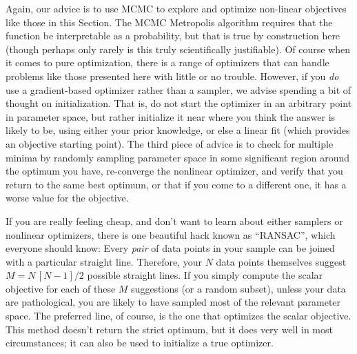 \documentclass[12pt,twoside]{article}
\newcommand{\sectionname}{Section}
\newcounter{problem}
\begin{document}
Again, our advice is to use MCMC to explore and optimize non-linear
objectives like those in this \sectionname.  The MCMC Metropolis
algorithm requires that the function be interpretable as a
probability, but that is true by construction here (though perhaps
only rarely is this truly scientifically justifiable).  Of course when
it comes to pure optimization, there is a range of optimizers that can
handle problems like those presented here with little or no trouble.
However, if you \emph{do} use a gradient-based optimizer rather than a
sampler, we advise spending a bit of thought on initialization.  That
is, do not start the optimizer in an arbitrary point in parameter
space, but rather initialize it near where you think the answer is
likely to be, using either your prior knowledge, or else a linear fit
(which provides an objective starting point).  The third piece of
advice is to check for multiple minima by randomly sampling parameter
space in some significant region around the optimum you have,
re-converge the nonlinear optimizer, and verify that you return to the
same best optimum, or that if you come to a different one, it has a
worse value for the objective.

If you are really feeling cheap, and don't want to learn about either
samplers or nonlinear optimizers, there is one beautiful hack known as
``RANSAC'', which everyone should know: Every \emph{pair} of data
points in your sample can be joined with a particular straight line.
Therefore, your $N$ data points themselves suggest $M=N\,[N-1]/2$
possible straight lines.  If you simply compute the scalar objective
for each of these $M$ suggestions (or a random subset), unless your
data are pathological, you are likely to have sampled most of the
relevant parameter space.  The preferred line, of course, is the one
that optimizes the scalar objective.  This method doesn't return the
strict optimum, but it does very well in most circumstances; it can
also be used to initialize a true optimizer.
\end{document}
